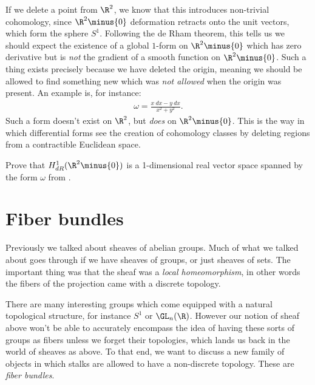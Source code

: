 \documentclass[11pt]{amsart}
\begin{document}
\begin{remark} If we delete a point from $\R^2$, we know that this introduces non-trivial cohomology, since $\R^2\minus\{0\}$ deformation retracts onto the unit vectors, which form the sphere $S^1$. Following the de Rham theorem, this tells us we should expect the existence of a global $1$-form on $\R^2\minus\{0\}$ which has zero derivative but is \emph{not} the gradient of a smooth function on $\R^2\minus\{0\}$. Such a thing exists precisely because we have deleted the origin, meaning we should be allowed to find something new which was \emph{not allowed} when the origin was present. An example is, for instance:
\begin{equation}\label{eqn:1-form-on-R2-minus-origin}
\begin{aligned}
    \omega = \frac{x\ dx - y\ dx}{x^2 + y^2}.
\end{aligned}
\end{equation}
Such a form doesn't exist on $\R^2$, but \emph{does} on $\R^2\minus\{0\}$. This is the way in which differential forms see the creation of cohomology classes by deleting regions from a contractible Euclidean space.
\end{remark}

\begin{exercise} Prove that $H^1_{dR}(\R^2\minus \{0\})$ is a 1-dimensional real vector space spanned by the form $\omega$ from .
\end{exercise}

\section{Fiber bundles}

Previously we talked about sheaves of abelian groups. Much of what we talked about goes through if we have sheaves of groups, or just sheaves of sets. The important thing was that the sheaf was a \emph{local homeomorphism}, in other words the fibers of the projection came with a discrete topology.

There are many interesting groups which come equipped with a natural topological structure, for instance $S^1$ or $\GL_n(\R)$. However our notion of sheaf above won't be able to accurately encompass the idea of having these sorts of groups as fibers unless we forget their topologies, which lands us back in the world of sheaves as above. To that end, we want to discuss a new family of objects in which stalks are allowed to have a non-discrete topology. These are \emph{fiber bundles}.
\end{document}
